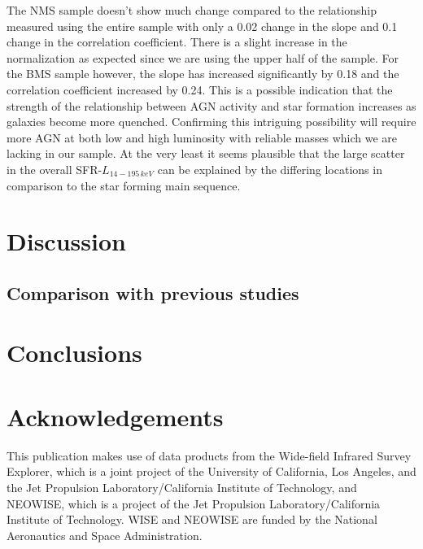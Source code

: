 \documentclass[fleqn, usenatbib]{mnras}
\begin{document}
The NMS sample doesn't show much change compared to the relationship measured using the entire sample with only a 0.02 change in the slope and 0.1 change in the correlation coefficient. There is a slight increase in the normalization as expected since we are using the upper half of the sample. For the BMS sample however, the slope has increased significantly by 0.18 and the correlation coefficient increased by 0.24. This is a possible indication that the strength of the relationship between AGN activity and star formation increases as galaxies become more quenched. Confirming this intriguing possibility will require more AGN at both low and high luminosity with reliable masses which we are lacking in our sample. At the very least it seems plausible that the large scatter in the overall SFR-$L_{14-195\,keV}$ can be explained by the differing locations in comparison to the star forming main sequence.

\section{Discussion}
\subsection{Comparison with previous studies}

\section{Conclusions}

\section*{Acknowledgements}
This publication makes use of data products from the Wide-field Infrared Survey Explorer, which is a joint project of the University of California, Los Angeles, and the Jet Propulsion Laboratory/California Institute of Technology, and NEOWISE, which is a project of the Jet Propulsion Laboratory/California Institute of Technology. WISE and NEOWISE are funded by the National Aeronautics and Space Administration.




\end{document}
